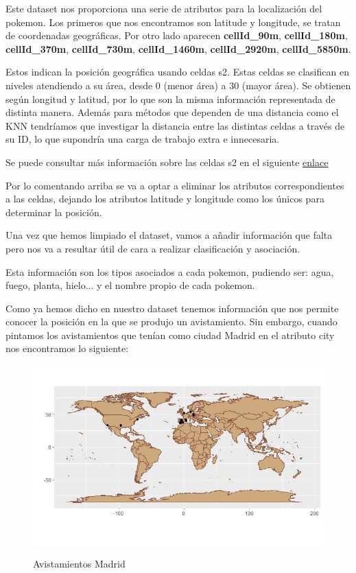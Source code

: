 Este dataset nos proporciona una serie de atributos para la localización del pokemon. Los primeros que nos encontramos son latitude y longitude, se tratan de coordenadas geográficas. Por otro lado aparecen \textbf{cellId\_90m}, \textbf{cellId\_180m}, \textbf{cellId\_370m}, \textbf{cellId\_730m}, \textbf{cellId\_1460m}, \textbf{cellId\_2920m}, \textbf{cellId\_5850m}. 

Estos indican la posición geográfica usando celdas s2. Estas celdas se clasifican en niveles atendiendo a su área, desde 0 (menor área) a 30 (mayor área). Se obtienen según longitud y latitud, por lo que son la misma información representada de distinta manera. Además para métodos que dependen de una distancia como el KNN tendríamos que investigar la distancia entre las distintas celdas a través de su ID, lo que supondría una carga de trabajo extra e innecesaria. 

Se puede consultar más información sobre las celdas s2 en el siguiente \href{http://blog.christianperone.com/2015/08/googles-s2-geometry-on-the-sphere-cells-and-hilbert-curve/}{enlace}

Por lo comentando arriba se va a optar a eliminar los atributos correspondientes a las celdas, dejando los atributos latitude y longitude como los únicos para determinar la posición.

Una vez que hemos limpiado el dataset, vamos a añadir información que falta pero nos va a resultar útil de cara a realizar clasificación y asociación. 

Esta información son los tipos asociados a cada pokemon, pudiendo ser: agua, fuego, planta, hielo... y el nombre propio de cada pokemon.

Como ya hemos dicho en nuestro dataset tenemos información que nos permite conocer la posición en la que se produjo un avistamiento. Sin embargo, cuando pintamos los avistamientos que tenían como ciudad Madrid en el atributo city nos encontramos lo siguiente:

\begin{figure}[H] %
\centering
\includegraphics[scale=0.8]{img/madrid.jpg}  %
\label{img/madrid.jpg}
\caption{Avistamientos Madrid}
\end{figure}


